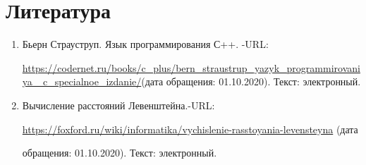 \documentclass[12pt]{report}
\begin{document}
\chapter*{Литература}

\begin{enumerate}
	\item Бьерн Страуструп. Язык программирования С++. -URL:\par 
	\href{https://codernet.ru/books/c_plus/bern_straustrup_yazyk_programmirovaniya_c_specialnoe_izdanie/}{https://codernet.ru/books/c\_plus/bern\_straustrup\_yazyk\_programmirovaniya\_
		c\_specialnoe\_izdanie/}(дата обращения:
	01.10.2020). Текст: электронный.
	\item Вычисление расстояний Левенштейна.-URL:\par
	\href{https://foxford.ru/wiki/informatika/vychislenie-rasstoyania-levensteyna}{https://foxford.ru/wiki/informatika/vychislenie-rasstoyania-levensteyna} (дата \par обращения:
	01.10.2020). Текст: электронный.
\end{enumerate}
\end{document}
